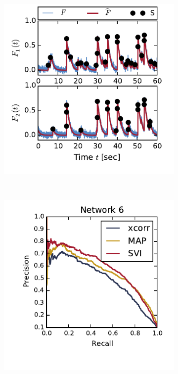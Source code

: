 \begin{figure}[t!]
  \begin{center}
    \begin{subfigure}[b]{0.32\linewidth}
      \caption{}
      \centering
      \includegraphics[width=\textwidth]{figures/ch2b/figure3a.pdf} 
      \label{fig:connectomics_data}
    \end{subfigure}
    ~
    \begin{subfigure}[b]{0.32\linewidth}
      \caption{}
      \centering
      \includegraphics[width=\textwidth]{figures/ch2b/figure3d.pdf} 

\end{subfigure}
\end{center}
\end{figure}
